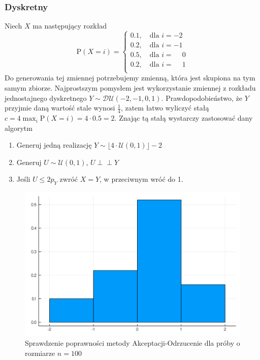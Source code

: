 \documentclass[12pt]{mwrep}
\newcommand{\indep}{\perp \!\!\! \perp}
\begin{document}
	\subsubsection{Dyskretny}
	\noindent Niech $X$ ma następujący rozkład
	\begin{equation}
		\mathrm{P}(X=i)=\begin{cases}
			0.1, \quad\text{dla $i=-2$}\\
			0.2, \quad\text{dla $i=-1$}\\
			0.5, \quad\text{dla $i=\phantom{-}0$}\\
			0.2, \quad\text{dla $i=\phantom{-}1$}\\
		\end{cases}
	\end{equation}
	Do generowania tej zmiennej potrzebujemy zmienną, która jest skupiona na tym samym zbiorze. Najprostszym pomysłem jest wykorzystanie zmiennej z rozkładu jednostajnego dyskretnego $Y\sim\mathcal{DU}(-2,-1,0,1)$. Prawdopodobieństwo, że $Y$ przyjmie daną wartość stale wynosi $\frac{1}{4}$, zatem łatwo wyliczyć stałą $c=4\max_i\mathrm{P}(X=i)=4\cdot0.5=2$. Znając tą stałą wystarczy zastosować dany algorytm
	\begin{enumerate}[leftmargin=10mm]
		\item Generuj jedną realizację $Y\sim\lfloor4\cdot\mathcal{U}(0,1)\rfloor-2$
		\item Generuj $U\sim \mathcal{U}(0,1)$, $U\indep Y$
		\item Jeśli $U\leqslant2p_Y$ zwróć $X=Y$, w przeciwnym wróć do 1.
	\end{enumerate}
	\begin{figure}[H]\caption{Sprawdzenie poprawności metody Akceptacji-Odrzucenie dla próby o rozmiarze $n=100$}\label{fig:AO_dysk}
		\centering\includegraphics[width=2\columnwidth/3]{fig/fig_AO_dysk.png}
	\end{figure}
	
\end{document}
